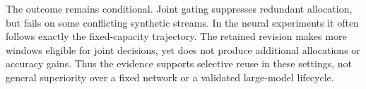 The outcome remains conditional. Joint gating suppresses redundant allocation, but fails on some conflicting synthetic streams. In the neural experiments it often follows exactly the fixed-capacity trajectory. The retained revision makes more windows eligible for joint decisions, yet does not produce additional allocations or accuracy gains. Thus the evidence supports selective reuse in these settings, not general superiority over a fixed network or a validated large-model lifecycle.
